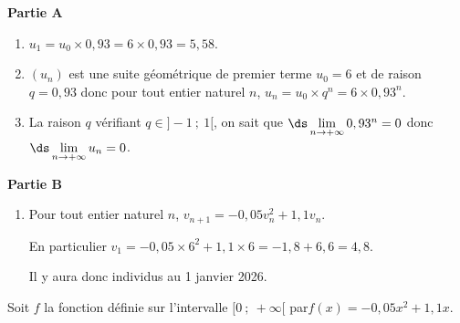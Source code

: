 \medskip

\textbf{Partie A}

\begin{enumerate}
	\item $u_1= u_0\times 0,93= 6 \times 0,93 = 5,58$.
	\item $(u_n)$ est une suite géométrique de premier terme $u_0 = 6$ et de raison $q=0,93$ donc pour tout entier naturel $n$,\: $u_n =u_0\times q^n=6\times 0,93^n$.
	\item La raison $q$ vérifiant $q \in ]-1~;~1[$, on sait que $\ds \lim\limits_{n \to +\infty} 0,93^n = 0$ donc $\ds \lim\limits_{n \to +\infty} u_n = 0$.
\end{enumerate}

\medskip

\textbf{Partie B}

\medskip

\begin{enumerate}
\item Pour tout entier naturel $n$, $v_{n+1} = -0,05v_n^2+1,1v_n$.

En particulier $v_1= - 0,05\times 6^2+ 1,1\times 6 = - 1,8 + 6,6 = 4,8$.
	
Il y aura donc  individus au 1 janvier 2026.
\end{enumerate}

Soit $f$ la fonction définie sur l'intervalle $[0~;~+\infty[$ par$f(x) = -0,05x^2 + 1,1x$.

